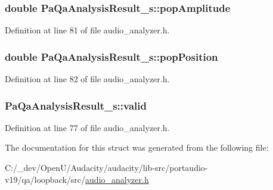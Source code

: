 \subsubsection[{\texorpdfstring{pop\+Amplitude}{popAmplitude}}]{\setlength{\rightskip}{0pt plus 5cm}double Pa\+Qa\+Analysis\+Result\+\_\+s\+::pop\+Amplitude}\hypertarget{struct_pa_qa_analysis_result__s_ab23ac837dc1cc396ab58326efea278ba}{}\label{struct_pa_qa_analysis_result__s_ab23ac837dc1cc396ab58326efea278ba}


Definition at line 81 of file audio\+\_\+analyzer.\+h.

\subsubsection[{\texorpdfstring{pop\+Position}{popPosition}}]{\setlength{\rightskip}{0pt plus 5cm}double Pa\+Qa\+Analysis\+Result\+\_\+s\+::pop\+Position}\hypertarget{struct_pa_qa_analysis_result__s_aa803a3ce07fc930d172f019881cb5b44}{}\label{struct_pa_qa_analysis_result__s_aa803a3ce07fc930d172f019881cb5b44}


Definition at line 82 of file audio\+\_\+analyzer.\+h.

\subsubsection[{\texorpdfstring{valid}{valid}}]{ Pa\+Qa\+Analysis\+Result\+\_\+s\+::valid}\hypertarget{struct_pa_qa_analysis_result__s_affa94b0959c600449a9473337ddd8abd}{}\label{struct_pa_qa_analysis_result__s_affa94b0959c600449a9473337ddd8abd}


Definition at line 77 of file audio\+\_\+analyzer.\+h.



The documentation for this struct was generated from the following file\+:\begin{DoxyCompactItemize}
\item 
C\+:/\+\_\+dev/\+Open\+U/\+Audacity/audacity/lib-\/src/portaudio-\/v19/qa/loopback/src/\hyperlink{audio__analyzer_8h}{audio\+\_\+analyzer.\+h}\end{DoxyCompactItemize}

